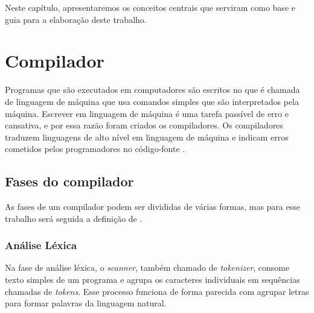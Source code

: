 \label{cap:fundamentacao-teorica}

Neste capítulo, apresentaremos os conceitos centrais que serviram como base e guia para a elaboração deste trabalho.

\section{Compilador}
Programas que são executados em computadores são escritos no que é chamada de linguagem de máquina que usa comandos simples que são interpretados pela máquina. Escrever em linguagem de máquina é uma tarefa passível de erro e cansativa, e por essa razão foram criados os compiladores. Os compiladores traduzem linguagens de alto nível em linguagem de máquina e indicam erros cometidos pelos programadores no código-fonte \cite{mogensen2024introduction}.

\subsection{Fases do compilador}
As fases de um compilador podem ser divididas de várias formas, mas para esse trabalho será seguida a definição de \textcite{thain2020introduction}. 


\begin{figure}[ht]
    \captionsetup{width=16cm}
\end{figure}
\FloatBarrier

\subsubsection{Análise Léxica}
Na fase de análise léxica, o \textit{scanner}, também chamado de \textit{tokenizer}, consome texto simples de um programa e agrupa os caracteres individuais em sequências chamadas de \textit{tokens}. Esse processo funciona de forma parecida com agrupar letras para formar palavras da linguagem natural.

